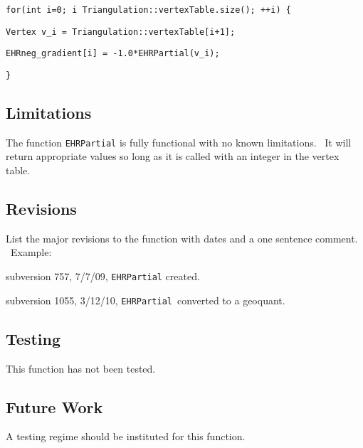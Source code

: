 \qquad \texttt{for(int i=0; i \TEXTsymbol{<}
Triangulation::vertexTable.size(); ++i) \{}

\qquad \qquad \texttt{Vertex v\_i = Triangulation::vertexTable[i+1];}

\qquad \qquad \texttt{EHRneg\_gradient[i] = -1.0*EHRPartial(v\_i);}

\qquad\qquad\texttt{\}}

\subsection*{Limitations}

The function \texttt{EHRPartial} is fully functional with no known
limitations. \ It will return appropriate values so long as it is called
with an integer in the vertex table. \ 

\subsection*{Revisions}

List the major revisions to the function with dates and a one sentence
comment. \ Example:

subversion 757, 7/7/09, \texttt{EHRPartial} created.

subversion 1055, 3/12/10, \texttt{EHRPartial}\ converted to a geoquant.

\subsection*{Testing}

This function has not been tested.

\subsection*{Future Work}

A testing regime should be instituted for this function. \ 
